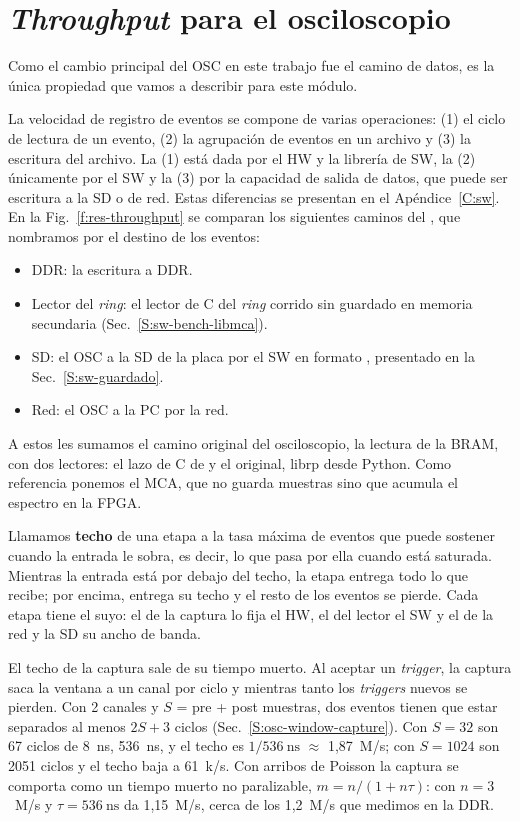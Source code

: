 \section{\emph{Throughput} para el osciloscopio}
\label{S:res-throughput-osc}

Como el cambio principal del OSC en este trabajo fue el camino de datos, es la
única propiedad que vamos a describir para este módulo.

La velocidad de registro de eventos se compone de varias operaciones: (1) el
ciclo de lectura de un evento, (2) la agrupación de eventos en un archivo y (3)
la escritura del archivo. La (1) está dada por el HW y la librería de SW, la (2)
únicamente por el SW y la (3) por la capacidad de salida de datos, que puede ser
escritura a la SD o de red. Estas diferencias se presentan en el
Apéndice~\ref{C:sw}. En la Fig.~\ref{f:res-throughput} se comparan los siguientes
caminos del , que nombramos por el destino de los eventos:
\begin{itemize}
\item DDR: la escritura a DDR.
\item Lector del \emph{ring}: el lector de C del \emph{ring} corrido sin guardado en memoria
  secundaria (Sec.~\ref{S:sw-bench-libmca}).
\item SD: el OSC a la SD de la placa por el SW en formato , presentado
  en la Sec.~\ref{S:sw-guardado}.
\item Red: el OSC a la PC por la red.
\end{itemize}
A estos les
sumamos el camino original del osciloscopio, la lectura de la BRAM, con dos
lectores: el lazo de C de  y el original, librp desde Python.
Como referencia ponemos el MCA, que no guarda muestras sino que acumula el
espectro en la FPGA.

Llamamos \textbf{techo} de una etapa a la tasa máxima de eventos que puede
sostener cuando la entrada le sobra, es decir, lo que pasa por ella cuando está
saturada. Mientras la entrada está por debajo del techo, la etapa entrega todo
lo que recibe; por encima, entrega su techo y el resto de los eventos se pierde.
Cada etapa tiene el suyo: el de la captura lo fija el HW, el del lector el SW y
el de la red y la SD su ancho de banda.

El techo de la captura sale de su tiempo muerto. Al aceptar un \emph{trigger},
la captura saca la ventana a un canal por ciclo y mientras tanto los
\emph{triggers} nuevos se pierden. Con 2 canales y $S$ = pre + post muestras,
dos eventos tienen que estar separados al menos $2S+3$ ciclos
(Sec.~\ref{S:osc-window-capture}). Con $S=32$ son 67 ciclos de
\qty{8}{\nano\second}, \qty{536}{\nano\second}, y el techo es
$1/\qty{536}{\nano\second}$ $\approx$ 1,87~M/s; con $S=1024$ son 2051 ciclos y el
techo baja a 61~k/s. Con arribos de Poisson la captura se comporta como un
tiempo muerto no paralizable, $m = n/(1+n\tau)$: con $n=3$~M/s y
$\tau=\qty{536}{\nano\second}$ da 1,15~M/s, cerca de los 1,2~M/s que medimos en la DDR.

